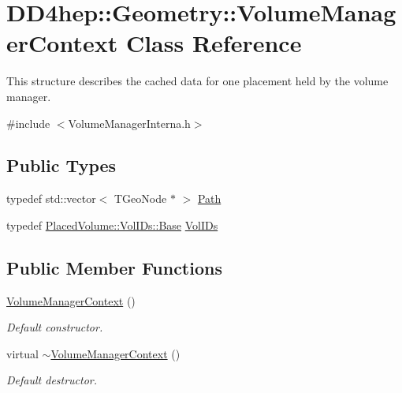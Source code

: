 \hypertarget{class_d_d4hep_1_1_geometry_1_1_volume_manager_context}{}\section{D\+D4hep\+:\+:Geometry\+:\+:Volume\+Manager\+Context Class Reference}
\label{class_d_d4hep_1_1_geometry_1_1_volume_manager_context}


This structure describes the cached data for one placement held by the volume manager.  




{\ttfamily \#include $<$Volume\+Manager\+Interna.\+h$>$}

\subsection*{Public Types}
\begin{DoxyCompactItemize}
\item 
typedef std\+::vector$<$ T\+Geo\+Node $\ast$ $>$ \hyperlink{class_d_d4hep_1_1_geometry_1_1_volume_manager_context_a7873b42c6ad25a77d4d7e240286a934c}{Path}
\item 
typedef \hyperlink{class_d_d4hep_1_1_geometry_1_1_placed_volume_extension_1_1_vol_i_ds_a9328d0964ef092fd108679b2ecafd5b7}{Placed\+Volume\+::\+Vol\+I\+Ds\+::\+Base} \hyperlink{class_d_d4hep_1_1_geometry_1_1_volume_manager_context_aedf28d4a226428cfc6ebaabaee0b4c9e}{Vol\+I\+Ds}
\end{DoxyCompactItemize}
\subsection*{Public Member Functions}
\begin{DoxyCompactItemize}
\item 
\hyperlink{class_d_d4hep_1_1_geometry_1_1_volume_manager_context_a7fabfa335945589f35053fa3bc3dcfc7}{Volume\+Manager\+Context} ()
\begin{DoxyCompactList}\small\item\em Default constructor. \end{DoxyCompactList}\item 
virtual \hyperlink{class_d_d4hep_1_1_geometry_1_1_volume_manager_context_aa150cfab1e19826e9e6fddd194b2390a}{$\sim$\+Volume\+Manager\+Context} ()
\begin{DoxyCompactList}\small\item\em Default destructor. \end{DoxyCompactList}\end{DoxyCompactItemize}
